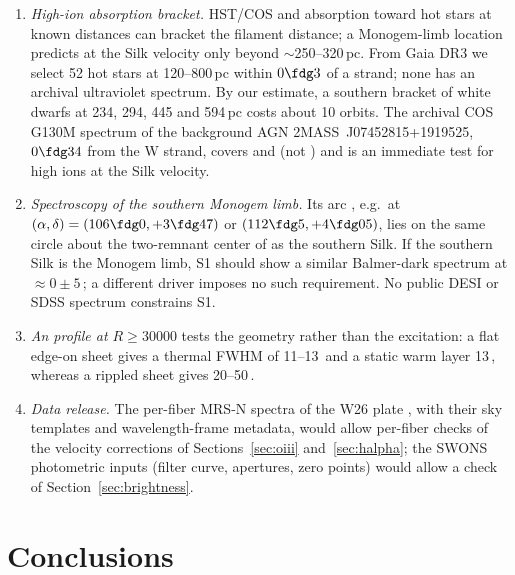 \begin{enumerate}
\item \textit{High-ion absorption bracket.} HST/COS \citep{Green2012}  and  absorption toward hot stars at known distances can bracket the filament distance; a Monogem-limb location predicts  at the Silk velocity only beyond $\sim$250--320\,pc. From Gaia DR3 \citep{Gaia2023} we select 52 hot stars at 120--800\,pc within $0\fdg3$ of a strand; none has an archival ultraviolet spectrum. By our estimate, a southern bracket of white dwarfs at 234, 294, 445 and 594\,pc costs about 10 orbits. The archival COS G130M spectrum of the background AGN 2MASS~J07452815+1919525, $0\fdg34$ from the W strand, covers  and  (not ) and is an immediate test for high ions at the Silk velocity.

\item \textit{Spectroscopy of the southern Monogem limb.} Its \Oiii{} arc \citep[here S1;][]{Fesen2026}, e.g.\ at $(\alpha,\delta)=(106\fdg0,+3\fdg47)$ or $(112\fdg5,+4\fdg05)$, lies on the same circle about the two-remnant center of \citet{Knies2024} as the southern Silk. If the southern Silk is the Monogem limb, S1 should show a similar Balmer-dark spectrum at \vlsr{} $\approx0\pm5$\,\kms; a different driver imposes no such requirement. No public DESI or SDSS spectrum constrains S1.

\item \textit{An \Oiii{} profile at $R\ge30000$} tests the geometry rather than the excitation: a flat edge-on sheet gives a thermal FWHM of 11--13\,\kms{} and a static warm layer 13\,\kms, whereas a rippled sheet gives 20--50\,\kms.

\item \textit{Data release.} The per-fiber MRS-N spectra of the W26 plate \citep[not public;][]{Zhang2025}, with their sky templates and wavelength-frame metadata, would allow per-fiber checks of the velocity corrections of Sections~\ref{sec:oiii} and~\ref{sec:halpha}; the SWONS photometric inputs (filter curve, apertures, zero points) would allow a check of Section~\ref{sec:brightness}.
\end{enumerate}

\section{Conclusions}\label{sec:conclusions}

